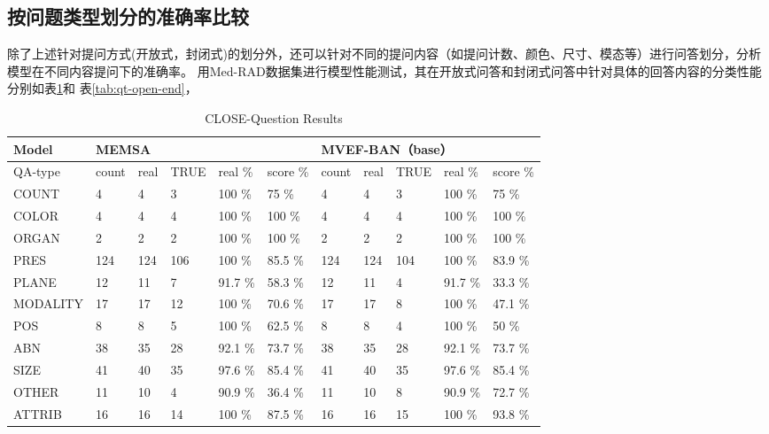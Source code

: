 \subsection{按问题类型划分的准确率比较}
除了上述针对提问方式(开放式，封闭式)的划分外，还可以针对不同的提问内容（如提问计数、颜色、尺寸、模态等）进行问答划分，分析
模型在不同内容提问下的准确率。
用Med-RAD数据集进行模型性能测试，其在开放式问答和封闭式问答中针对具体的回答内容的分类性能分别如表\ref{tab:qt-close-end}和
表\ref{tab:qt-open-end}，
\begin{table}
	\caption{\label{tab:qt-close-end}CLOSE-Question Results}
	\centering
	\small %
	\begin{tabular}{l|lllll|lllll} %
		\hline Model & \multicolumn{5}{l}{\textbf{MEMSA}} & \multicolumn{5}{|l}{\textbf{MVEF-BAN}（base）} \\ 
		\hline QA-type & count & real & TRUE & real \% & score \% & count & real & TRUE & real \% & score \%\\ 
		\hline COUNT & 4 & 4 & 3 & 100 \%& 75 \%& 4 & 4 & 3 & 100 \%& 75 \%\\
		COLOR & 4 & 4 & 4 & 100 \%& 100 \%& 4 & 4 & 4 & 100 \%& 100 \%\\
		ORGAN & 2 & 2 & 2 & 100 \%& 100 \%& 2 & 2 & 2 & 100 \%& 100 \%\\
		PRES & 124 & 124 & 106 & 100 \%& 85.5 \%& 124 & 124 & 104 & 100 \%& 83.9 \%\\
		PLANE & 12 & 11 & 7 & 91.7 \%& 58.3 \%& 12 & 11 & 4 & 91.7 \%& 33.3 \%\\
		MODALITY & 17 & 17 & 12 & 100 \%& 70.6 \%& 17 & 17 & 8 & 100 \%& 47.1 \%\\
		POS & 8 & 8 & 5 & 100 \%& 62.5 \%& 8 & 8 & 4 & 100 \%& 50 \%\\
		ABN & 38 & 35 & 28 & 92.1 \%& 73.7 \%& 38 & 35 & 28 & 92.1 \%& 73.7 \%\\
		SIZE & 41 & 40 & 35 & 97.6 \%& 85.4 \%& 41 & 40 & 35 & 97.6 \%& 85.4 \%\\
		OTHER & 11 & 10 & 4 & 90.9 \%& 36.4 \%& 11 & 10 & 8 & 90.9 \%& 72.7 \%\\
		ATTRIB & 16 & 16 & 14 & 100 \%& 87.5 \%& 16 & 16 & 15 & 100 \%& 93.8 \%\\
		\hline
		\end{tabular}
\end{table}

